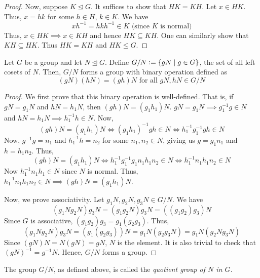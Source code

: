 \begin{proof}
    \medskip
    
    Now, suppose $K \trianglelefteq G$. It suffices to show that $HK = KH$. Let $x \in HK$. Thus, $x = hk$ for some $h \in H$, $k \in K$. We have
    \[
        xh^{-1} = hkh^{-1} \in K \text{  (since $K$ is normal)}
    \]
    Thus, $x \in HK \implies x \in KH$ and hence $HK \subseteq KH$. One can similarly show that $KH \subseteq HK$. Thus $HK = KH$ and $HK \leq G$.
\end{proof}


\begin{prop} \label{prop:quotient-group-is-a-group}
    Let $G$ be a group and let $N \trianglelefteq G$. Define $G/N \vcentcolon= \left\{ gN \mid g \in G \right\}$, the set of all left cosets of $N$. Then, $G/N$ forms a group with binary operation defined as
    \[
        (gN)(hN) = (gh)N \text{ for all } gN, hN \in G/N
    \]
\end{prop}
\begin{proof}
We first prove that this binary operation is well-defined. That is, if $gN = g_1N$ and $hN = h_1N$, then $(gh)N = (g_1h_1)N$. $gN = g_1N \implies g_1^{-1}g \in N$ and $hN = h_1N \implies h_1^{-1}h \in N$. Now,
\[
    (gh)N = (g_1h_1)N \iff (g_1h_1)^{-1}gh \in N \iff h_1^{-1}g_1^{-1}gh \in N
\]  
Now, $g^{-1}g = n_1$ and $h_1^{-1}h = n_2$ for some $n_1,n_2 \in N$, giving us $g = g_1n_1$ and $h=h_1n_2$. Thus,
\[
    (gh)N = (g_1h_1)N \iff h_1^{-1}g_1^{-1}g_1n_1h_1n_2 \in N \iff h_1^{-1}n_1h_1n_2 \in N
\]
Now $h_1^{-1}n_1h_1 \in N$ since $N$ is normal. Thus, $h_1^{-1}n_1h_1n_2 \in N \implies (gh)N = (g_1h_1)N$. 

\medskip

Now, we prove associativity. Let $g_1N, g_2N, g_3N \in G/N$. We have
\[
\left( g_1Ng_2N \right)g_3N = (g_1g_2 N)g_3N = \left( (g_1g_2)g_3 \right)N 
\]
Since $G$ is associative, $(g_1g_2)g_3 = g_1(g_2g_3)$. Thus, 
\[
    \left( g_1Ng_2N \right)g_3N = \left( g_1(g_2g_3) \right)N = g_1N(g_2g_3N) = g_1N\left( g_2N g_3N\right)
\]
Since $(gN)N = N(gN) = gN$, $N$ is the element. It is also trivial to check that $(gN)^{-1} = g^{-1}N$. Hence, $G/N$ forms a group.
\end{proof}

\begin{rem}
    The group $G/N$, as defined above, is called the \emph{quotient group of $N$ in $G$.}
\end{rem}

